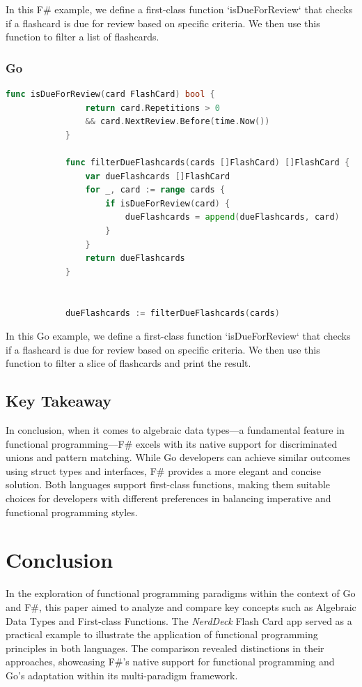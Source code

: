         In this F\# example, we define a first-class function `isDueForReview` that checks if a flashcard is due for review based on specific criteria. We then use this function to filter a list of flashcards.
        
    \subsection*{Go}    
        \begin{lstlisting}[language=go, firstnumber=1, caption={FlashCard representation in F\#}, label=l:flashcardfsharp]
            func isDueForReview(card FlashCard) bool {
                return card.Repetitions > 0 
                && card.NextReview.Before(time.Now())
            }
            
            func filterDueFlashcards(cards []FlashCard) []FlashCard {
                var dueFlashcards []FlashCard
                for _, card := range cards {
                    if isDueForReview(card) {
                        dueFlashcards = append(dueFlashcards, card)
                    }
                }
                return dueFlashcards
            }
            
    
            dueFlashcards := filterDueFlashcards(cards)
            \end{lstlisting}
            
            In this Go example, we define a first-class function `isDueForReview` that checks if a flashcard is due for review based on specific criteria. We then use this function to filter a slice of flashcards and print the result.

    \section{Key Takeaway}\label{sec:keytakeaway}
    In conclusion, when it comes to algebraic data types—a fundamental feature in functional programming—F\# excels with its native support for discriminated unions and pattern matching. While Go developers can achieve similar outcomes using struct types and interfaces, F\# provides a more elegant and concise solution. Both languages support first-class functions, making them suitable choices for developers with different preferences in balancing imperative and functional programming styles.


\chapter{Conclusion}\label{chap:conclusion}
In the exploration of functional programming paradigms within the context of Go and F\#, this paper aimed to analyze and compare key concepts such as Algebraic Data Types and First-class Functions. The \textit{NerdDeck} Flash Card \ac{app} served as a practical example to illustrate the application of functional programming principles in both languages. The comparison revealed distinctions in their approaches, showcasing F\#'s native support for functional programming and Go's adaptation within its multi-paradigm framework.
